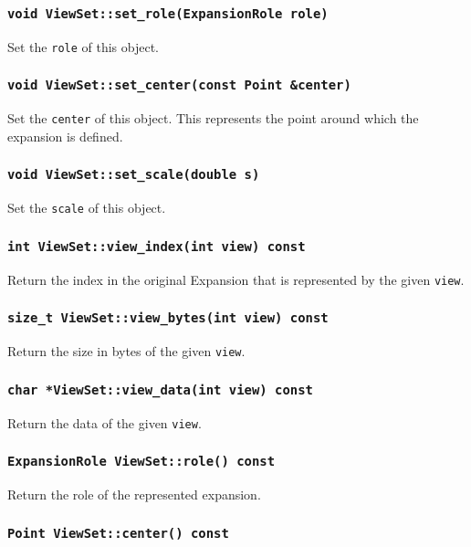 \subsubsection{\texttt{void ViewSet::set\_role(ExpansionRole role)}}

Set the \texttt{role} of this object.

\subsubsection{\texttt{void ViewSet::set\_center(const Point \&center)}}

Set the \texttt{center} of this object. This represents the point around
which the expansion is defined.

\subsubsection{\texttt{void ViewSet::set\_scale(double s)}}

Set the \texttt{scale} of this object. 

\subsubsection{\texttt{int ViewSet::view\_index(int view) const}}

Return the index in the original Expansion that is represented by the
given \texttt{view}.

\subsubsection{\texttt{size\_t ViewSet::view\_bytes(int view) const}}

Return the size in bytes of the given \texttt{view}.

\subsubsection{\texttt{char *ViewSet::view\_data(int view) const}}

Return the data of the given \texttt{view}.

\subsubsection{\texttt{ExpansionRole ViewSet::role() const}}

Return the role of the represented expansion.

\subsubsection{\texttt{Point ViewSet::center() const}}

